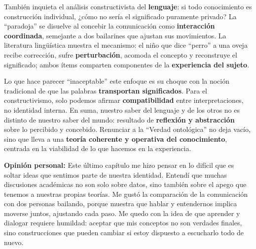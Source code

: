 \documentclass{article}
\begin{document}
También inquieta el análisis constructivista del \textbf{lenguaje}: si todo conocimiento es construcción individual, ¿cómo no sería el significado puramente privado? La “paradoja” se disuelve al concebir la comunicación como \textbf{interacción coordinada}, semejante a dos bailarines que ajustan sus movimientos. La literatura lingüística muestra el mecanismo: el niño que dice “perro” a una oveja recibe corrección, sufre \textbf{perturbación}, acomoda el concepto y reconstruye el significado; ambos ítems comparten componentes de la \textbf{experiencia del sujeto}.

Lo que hace parecer “inaceptable” este enfoque es su choque con la noción tradicional de que las palabras \textbf{transportan significados}. Para el constructivismo, solo podemos afirmar \textbf{compatibilidad} entre interpretaciones, no identidad interna. En suma, nuestro saber del lenguaje y de los otros no es distinto de nuestro saber del mundo: resultado de \textbf{reflexión y abstracción} sobre lo percibido y concebido. Renunciar a la “Verdad ontológica” no deja vacío, sino que lleva a una \textbf{teoría coherente y operativa del conocimiento}, centrada en la viabilidad de lo que hacemos en la experiencia.

\textbf{Opinión personal:}  
Este último capítulo me hizo pensar en lo difícil que es soltar ideas que sentimos parte de nuestra identidad. Entendí que muchas discusiones académicas no son solo sobre datos, sino también sobre el apego que tenemos a nuestras propias teorías. Me gustó la comparación de la comunicación con dos personas bailando, porque muestra que hablar y entendernos implica moverse juntos, ajustando cada paso. Me quedo con la idea de que aprender y dialogar requiere humildad: aceptar que mis conceptos no son verdades finales, sino construcciones que pueden cambiar si estoy dispuesto a escucharlo todo de nuevo.
\end{document}
